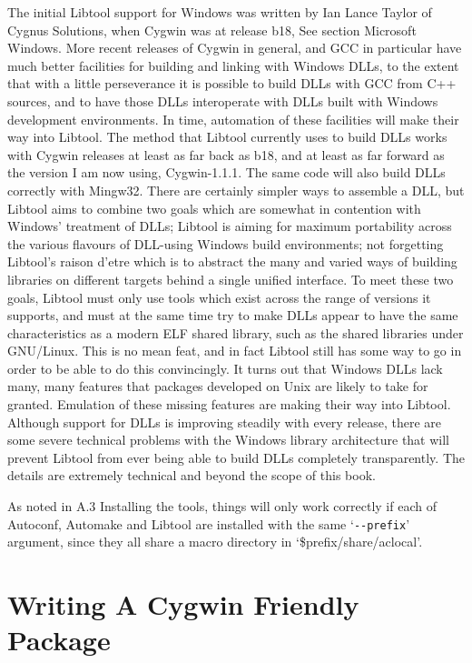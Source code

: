 The initial Libtool support for Windows was written by Ian Lance Taylor of Cygnus Solutions, when Cygwin was at release b18, See section Microsoft Windows. More recent releases of Cygwin in general, and GCC in particular have much better facilities for building and linking with Windows DLLs, to the extent that with a little perseverance it is possible to build DLLs with GCC from C++ sources, and to have those DLLs interoperate with DLLs built with Windows development environments. In time, automation of these facilities will make their way into Libtool. The method that Libtool currently uses to build DLLs works with Cygwin releases at least as far back as b18, and at least as far forward as the version I am now using, Cygwin-1.1.1. The same code will also build DLLs correctly with Mingw32. There are certainly simpler ways to assemble a DLL, but Libtool aims to combine two goals which are somewhat in contention with Windows' treatment of DLLs; Libtool is aiming for maximum portability across the various flavours of DLL-using Windows build environments; not forgetting Libtool's raison d'etre which is to abstract the many and varied ways of building libraries on different targets behind a single unified interface. To meet these two goals, Libtool must only use tools which exist across the range of versions it supports, and must at the same time try to make DLLs appear to have the same characteristics as a modern ELF shared library, such as the shared libraries under GNU/Linux. This is no mean feat, and in fact Libtool still has some way to go in order to be able to do this convincingly. It turns out that Windows DLLs lack many, many features that packages developed on Unix are likely to take for granted. Emulation of these missing features are making their way into Libtool. Although support for DLLs is improving steadily with every release, there are some severe technical problems with the Windows library architecture that will prevent Libtool from ever being able to build DLLs completely transparently. The details are extremely technical and beyond the scope of this book. 

As noted in A.3 Installing the tools, things will only work correctly if each 
of Autoconf, Automake and Libtool are installed with the same `\verb+--prefix+'
argument, since they all share a macro directory in `\$prefix/share/aclocal'. 


\section{Writing A Cygwin Friendly Package}

